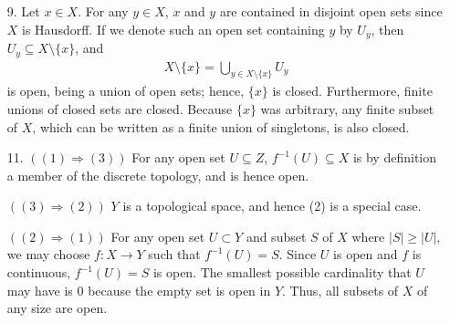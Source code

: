 \documentclass[a4paper,12pt]{article}
\begin{document}
\begin{enumerate}
    \item[9.]
        Let $x \in X$. For any $y \in X$, $x$ and $y$ are contained in disjoint open sets since $X$ is Hausdorff. If we denote such an open set containing $y$ by $U_y$, then $U_y \subseteq X \setminus \{x\}$, and
        \begin{align*}
            X \setminus \{x\} = \bigcup_{y \in X \setminus \{x\}} U_y
        \end{align*}
        is open, being a union of open sets; hence, $\{x\}$ is closed. Furthermore, finite unions of closed sets are closed. Because $\{x\}$ was arbitrary, any finite subset of $X$, which can be written as a finite union of singletons, is also closed.

    \item[11.]
        $((1) \Rightarrow (3))$ For any open set $U \subseteq Z$, $f^{-1}(U) \subseteq X$ is by definition a member of the discrete topology, and is hence open. \par
        $((3) \Rightarrow (2))$ $Y$ is a topological space, and hence (2) is a special case. \par
        $((2) \Rightarrow (1))$ For any open set $U \subset Y$ and subset $S$ of $X$ where $|S| \geq |U|$, we may choose $f : X \to Y$ such that $f^{-1}(U) = S$. Since $U$ is open and $f$ is continuous, $f^{-1}(U) = S$ is open. The smallest possible cardinality that $U$ may have is $0$ because the empty set is open in $Y$. Thus, all subsets of $X$ of any size are open.


\end{enumerate}
\end{document}
